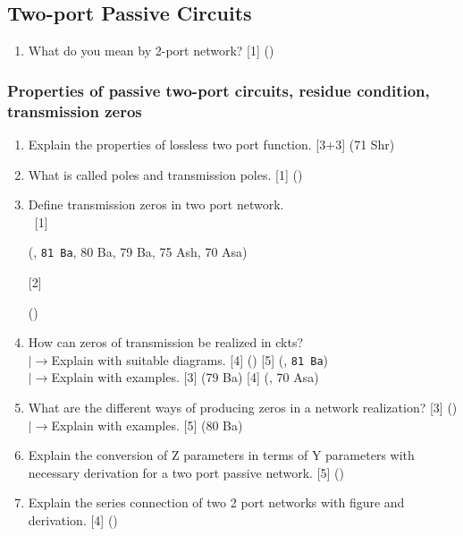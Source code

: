 \documentclass[12pt]{article}
\newcommand{\lb}{\\$\left|\rightarrow\right.$}
\newcommand{\enter}{\\\textcolor{white}{1}}
\begin{document}
\subsection{Two-port Passive Circuits}
\begin{enumerate}[noitemsep, topsep=0pt]
	\item What do you mean by 2-port network? \hfill [1] () 
\end{enumerate}
\subsubsection{Properties of passive two-port circuits, residue condition, transmission zeros}
\begin{enumerate}[noitemsep, topsep=0pt]
	\item Explain the properties of lossless two port function. \hfill [3+3] (71 Shr)

	\item What is called poles and transmission poles. \hfill [1] ()

	\item Define transmission zeros in two port network.
	\enter\hfill [1] \begin{footnotesize}(, \texttt{81 Ba}, 80 Ba, 79 Ba, 75 Ash, 70 Asa)\end{footnotesize} [2] \begin{footnotesize}()\end{footnotesize}
	
	\item How can zeros of transmission be realized in ckts?
	\lb Explain with suitable diagrams. \hfill [4] () [5] (, \texttt{81 Ba})
	\lb Explain with examples. \hfill [3] (79 Ba) [4] (, 70 Asa)
	
	\item What are the different ways of producing zeros in a network realization? \hfill [3] ()
	\lb Explain with examples. \hfill [5] (80 Ba)

	\item Explain the conversion of Z parameters in terms of Y parameters with necessary derivation for a two port passive network. \hfill [5] ()	
	
	\item Explain the series connection of two 2 port networks with figure and derivation. \hfill [4] ()
\end{enumerate}
\end{document}
